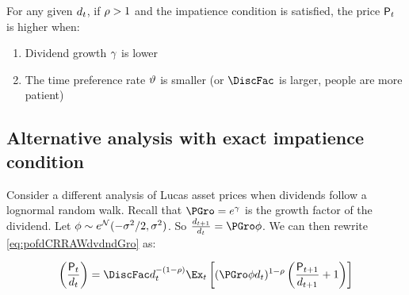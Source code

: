 \documentclass{\handout}
\begin{document}
\noindent For any given $d_{t}$, if $\rho > 1$ and the impatience condition is satisfied, the price $\mathsf{P}_{t}$ is higher when:
\begin{enumerate}
\item Dividend growth $\gamma$ is lower
\item The time preference rate $\vartheta$ is smaller (or $\DiscFac$ is larger, people are more patient)
\end{enumerate}

% 

\subsection{Alternative analysis with exact impatience condition}

Consider a different analysis of Lucas asset prices when dividends follow a lognormal random walk.
Recall that $\PGro=e^{\pGro}$ is the growth factor of the dividend.
Let $\phi \sim e^\mathcal{N}(-\sigma^{2}/2,\sigma^{2})$.
So $\frac{\dvdnd_{t+1}}{\dvdnd_{t}} = \PGro \phi $.
We can then rewrite \eqref{eq:pofdCRRAWdvdndGro} as:

\begin{equation}
  \left(\frac{\Price_{t}}{\dvdnd_{t}}\right) =  \DiscFac \dvdnd_{t}^{-(1-\CRRA)} \Ex_{t}\left[(\PGro \phi d_{t})^{1-\CRRA}\left(\frac{\Price_{t+1}}{\dvdnd_{t+1}}+1\right)\right] 
 \end{equation}
\end{document}
